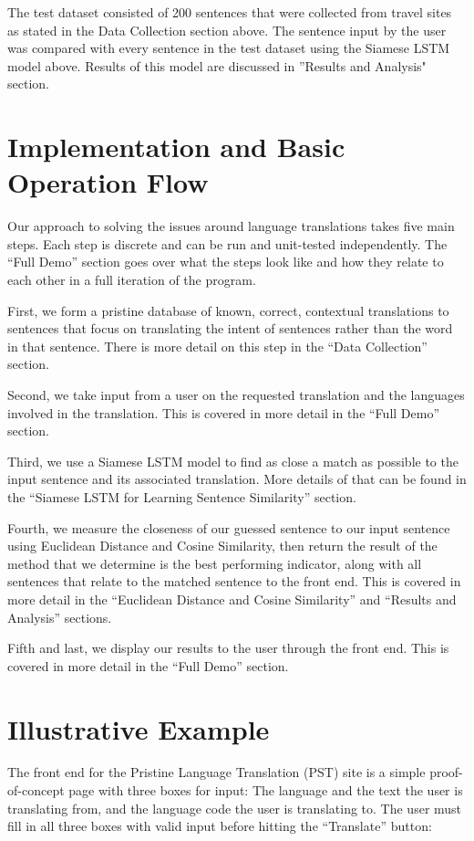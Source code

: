 \documentclass[runningheads]{llncs}
\begin{document}
	The test dataset consisted of 200 sentences that were collected from travel sites as stated in the Data Collection section above. The sentence input by the user was compared with every sentence in the test dataset using the Siamese LSTM model above.	Results of this model are discussed in ''Results and Analysis" section.
	
	\section{Implementation and Basic Operation Flow}
	Our approach to solving the issues around language translations takes five main steps. Each step is discrete and can be run and unit-tested independently. The ``Full Demo'' section goes over what the steps look like and how they relate to each other in a full iteration of the program. 

	First, we form a pristine database of known, correct, contextual translations to sentences that focus on translating the intent of sentences rather than the word in that sentence. There is more detail on this step in the ``Data Collection'' section. 

	Second, we take input from a user on the requested translation and the languages involved in the translation. This is covered in more detail in the ``Full Demo'' section. 

	Third, we use a Siamese LSTM model to find as close a match as possible to the input sentence and its associated translation.  More details of that can be found in the ``Siamese LSTM for Learning Sentence Similarity'' section. 

	Fourth, we measure the closeness of our guessed sentence to our input sentence using Euclidean Distance and Cosine Similarity, then return the result of the method that we determine is the best performing indicator, along with all sentences that relate to the matched sentence to the front end. This is covered in more detail in the ``Euclidean Distance and Cosine Similarity'' and ``Results and Analysis'' sections.

	Fifth and last, we display our results to the user through the front end. This is covered in more detail in the ``Full Demo'' section.
	
	
	\section{Illustrative Example}
	The front end for the Pristine Language Translation (PST) site is a simple proof-of-concept page with three boxes for input: The language and the text the user is translating from, and the language code the user is translating to. The user must fill in all three boxes with valid input before hitting the ``Translate'' button:
\end{document}
